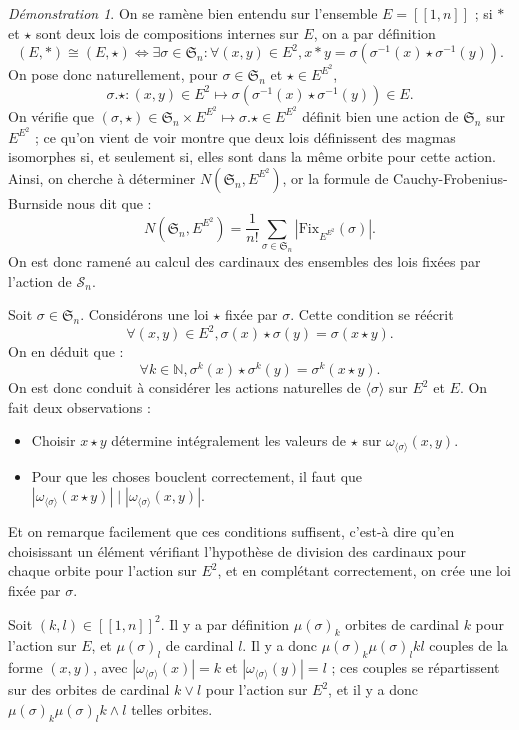 \documentclass{article}
\theoremstyle{definition}
\theoremstyle{remark}
\newtheorem*{demonstration}{Démonstration}
\begin{document}
\begin{demonstration}
    On se ramène bien entendu sur l'ensemble $E=[\![1,n]\!]$ ; si $*$ et $\star$ sont deux lois de compositions internes sur $E$, on a par définition
    $$(E,*)\cong(E,\star)\Leftrightarrow\exists\sigma\in\mathfrak S_n:\forall (x,y)\in E^2,x*y=\sigma(\sigma^{-1}(x)\star\sigma^{-1}(y)).$$
    On pose donc naturellement, pour $\sigma\in\mathfrak S_n$ et $\star\in E^{E^2}$,
    $$\sigma.\star:(x,y)\in E^2\mapsto\sigma(\sigma^{-1}(x)\star\sigma^{-1}(y))\in E.$$
    On vérifie que $(\sigma,\star)\in \mathfrak S_n\times E^{E^2}\mapsto \sigma.\star\in E^{E^2}$ définit bien une action de $\mathfrak S_n$ sur $E^{E^2}$ ; ce qu'on vient de voir montre que deux lois définissent des magmas isomorphes si, et seulement si, elles sont dans la même orbite pour cette action. Ainsi, on cherche à déterminer $N\left(\mathfrak S_n,E^{E^2}\right)$, or la formule de Cauchy-Frobenius-Burnside nous dit que :
    $$N\left(\mathfrak S_n,E^{E^2}\right)=\frac{1}{n!}\sum_{\sigma\in \mathfrak S_n}\left|\mathrm{Fix}_{E^{E^2}}(\sigma)\right|.$$
    On est donc ramené au calcul des cardinaux des ensembles des lois fixées par l'action de $\mathcal S_n$.

    Soit $\sigma\in\mathfrak S_n$. Considérons une loi $\star$ fixée par $\sigma$. Cette condition se réécrit
    $$\forall(x,y)\in E^2, \sigma(x)\star\sigma(y)=\sigma(x\star y).$$
    On en déduit que :
    $$\forall k\in\mathbb N,\sigma^k(x)\star\sigma^k(y)=\sigma^k(x\star y).$$
    On est donc conduit à considérer les actions naturelles de $\langle\sigma\rangle$ sur $E^2$ et $E$. On fait deux observations :
    \begin{itemize}
        \item Choisir $x\star y$ détermine intégralement les valeurs de $\star$ sur $\omega_{\langle\sigma\rangle}(x,y)$.
        \item Pour que les choses bouclent correctement, il faut que $|\omega_{\langle\sigma\rangle}(x\star y)|\mid|\omega_{\langle\sigma\rangle}(x,y)|$.
    \end{itemize}
    
    Et on remarque facilement que ces conditions suffisent, c'est-à dire qu'en choisissant un élément vérifiant l'hypothèse de division des cardinaux pour chaque orbite pour l'action sur $E^2$, et en complétant correctement, on crée une loi fixée par $\sigma$.

    Soit $(k,l)\in[\![1,n]\!]^2$. Il y a par définition $\mu(\sigma)_k$ orbites de cardinal $k$ pour l'action sur $E$, et $\mu(\sigma)_l$ de cardinal $l$. Il y a donc $\mu(\sigma)_k\mu(\sigma)_lkl$ couples de la forme $(x,y)$, avec $|\omega_{\langle\sigma\rangle}(x)|=k$ et $|\omega_{\langle\sigma\rangle}(y)|=l$ ; ces couples se répartissent sur des orbites de cardinal $k\lor l$ pour l'action sur $E^2$, et il y a donc $\mu(\sigma)_k\mu(\sigma)_lk\land l$ telles orbites.


\end{demonstration}
\end{document}
